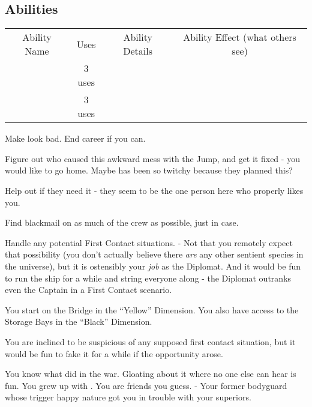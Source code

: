 \documentclass[char]{TMFHope}
\begin{document}
\subsection{Abilities}
\begin{tabular}{ |c|c|c|c| } 
 \hline
 Ability Name & Uses & Ability Details & Ability Effect (what others see) \\ 
 \aNegotiation{\MyName} & 3 uses & \aNegotiation{\MYtext} & \aNegotiation{\MYeffect} \\ 
 \aFirstAid{\MyName} & 3 uses & \aFirstAid{\MYtext} & \aFirstAid{\MYeffect}\\ 
 \hline
\end{tabular}

\begin{itemz}[Goals]
	\item Make \cWeap{} look bad. End \cWeap{\their} career if you can.
	\item Figure out who caused this awkward mess with the Jump, and get it fixed - you would like to go home. Maybe \cXO{} has been so twitchy because they planned this?
	\item Help \cMed{} out if they need it - they seem to be the one person here who properly likes you.
	\item Find blackmail on as much of the crew as possible, just in case.
	\item Handle any potential First Contact situations. - Not that you remotely expect that possibility (you don't actually believe there \emph{are} any other sentient species in the universe), but it is ostensibly your \emph{job} as the Diplomat. And it would be fun to run the ship for a while and string everyone along - the Diplomat outranks even the Captain in a First Contact scenario.
\end{itemz}

\begin{itemz}[Notes]
	\item You start on the Bridge in the ``Yellow'' Dimension. You also have access to the Storage Bays in the ``Black'' Dimension. 
	\item You are inclined to be suspicious of any supposed first contact situation, but it would be fun to fake it for a while if the opportunity arose.
\end{itemz}

\begin{contacts}
	\contact{\cXO{}} You know what \cXO{\they} did in the war. Gloating about it where no one else can hear is fun.
	\contact{\cMed{}} You grew up with \cMed{\them}. You are friends you guess.
	\contact{\cWeap{}} - Your former bodyguard whose trigger happy nature got you in trouble with your superiors.
\end{contacts}
\end{document}
